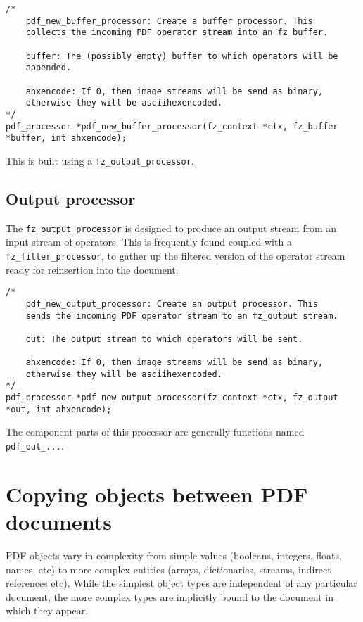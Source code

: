 \documentclass[oneside]{book}
\begin{document}
\begin{lstlisting}
/*
	pdf_new_buffer_processor: Create a buffer processor. This
	collects the incoming PDF operator stream into an fz_buffer.

	buffer: The (possibly empty) buffer to which operators will be
	appended.

	ahxencode: If 0, then image streams will be send as binary,
	otherwise they will be asciihexencoded.
*/
pdf_processor *pdf_new_buffer_processor(fz_context *ctx, fz_buffer *buffer, int ahxencode);
\end{lstlisting}

This is built using a \texttt{fz\_output\_processor}.

\subsection{Output processor}

The \texttt{fz\_output\_processor} is designed to produce an output stream from an input stream of operators. This is frequently found coupled with a \texttt{fz\_filter\_processor}, to gather up the filtered version of the operator stream ready for reinsertion into the document.

\begin{lstlisting}
/*
	pdf_new_output_processor: Create an output processor. This
	sends the incoming PDF operator stream to an fz_output stream.

	out: The output stream to which operators will be sent.

	ahxencode: If 0, then image streams will be send as binary,
	otherwise they will be asciihexencoded.
*/
pdf_processor *pdf_new_output_processor(fz_context *ctx, fz_output *out, int ahxencode);
\end{lstlisting}

The component parts of this processor are generally functions named \texttt{pdf\_out\_...}.

\section{Copying objects between PDF documents}

PDF objects vary in complexity from simple values (booleans, integers, floats, names, etc) to more complex entities (arrays, dictionaries, streams, indirect references etc). While the simplest object types are independent of any particular document, the more complex types are implicitly bound to the document in which they appear.
\end{document}

